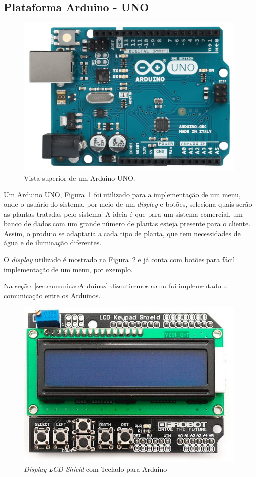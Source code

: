 \documentclass[a4paper,12pt]{report}
\begin{document}
		\subsection{Plataforma Arduino - UNO}
			
			\begin{figure}[!h]
				\centering
				\includegraphics[width=0.5\linewidth]{figs/ARDUINO_UNO_A06}
				\caption{Vista superior de um Arduino UNO.}
				\label{fig:UNO}
			\end{figure}
		
			Um Arduino UNO, Figura~\ref{fig:UNO} foi utilizado para a implementação de um menu, onde o usuário do sistema, por meio de um \textit{display} e botões, seleciona quais serão as plantas tratadas pelo sistema. A ideia é que para um sistema comercial, um banco de dados com um grande número de plantas esteja presente para o cliente. Assim, o produto se adaptaria a cada tipo de planta, que tem necessidades de água e de iluminação diferentes. 
			
			O \textit{display} utilizado é mostrado na Figura~\ref{fig:keyboard} e já conta com botões para fácil implementação de um menu, por exemplo.
			
		    Na seção~\ref{sec:comunicaoArduinos} discutiremos como foi implementado a comunicação entre os Arduinos. 	
			\begin{figure}[!h]
				\centering
				\includegraphics[width=0.7\linewidth]{figs/lcd-keyboard}
				\caption{\textit{Display LCD Shield} com Teclado para Arduino}
				\label{fig:keyboard}
			\end{figure}
			
\end{document}
